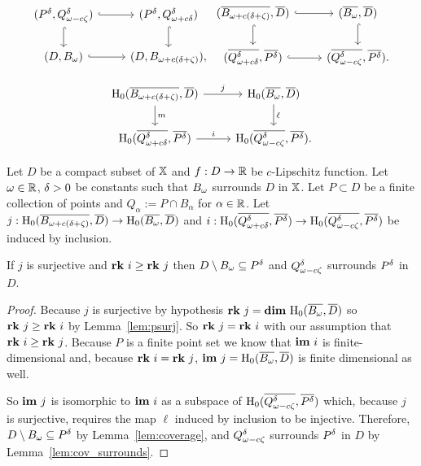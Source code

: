 \[ \begin{tikzcd}
  (P^\of, \Q^\of) \arrow[hookrightarrow]{r}\arrow[hookrightarrow]{d} &
  (P^\of, \QQ^\of) \arrow[hookrightarrow]{d} \\
  (D, \bb) \arrow[hookrightarrow]{r} &
  (D, B_{\omega+c(\delta+\zeta)}),
\end{tikzcd}\begin{tikzcd}
  (\cmp{B_{\omega+c(\delta+\zeta)}},\cmp{D})\arrow[hookrightarrow]{d}\arrow[hookrightarrow]{r} &
  (\cmp{\bb}, \cmp{D}) \arrow[hookrightarrow]{d}\\
  (\cmp{\QQ^\of}, \cmp{P^\of}) \arrow[hookrightarrow]{r} &
  (\cmp{\Q^\of}, \cmp{P^\of}).
\end{tikzcd}\]

\begin{equation}\label{dgm:1}\begin{tikzcd}
  \hom_0(\cmp{B_{\omega+c(\delta+\zeta)}},\cmp{D})\arrow{d}{m} \arrow{r}{j} &
  \hom_0(\cmp{\bb}, \cmp{D}) \arrow{d}{\ell} \\
  \hom_0(\cmp{\QQ^\of}, \cmp{P^\of}) \arrow{r}{i} &
  \hom_0(\cmp{\Q^\of}, \cmp{P^\of}).
\end{tikzcd}\end{equation}

\begin{theorem}\label{thm:geo_tcc}
  Let $D$ be a compact subset of $\mathbb{X}$ and $f : D\to\mathbb{R}$ be $c$-Lipschitz function.
  Let $\omega\in\mathbb{R}$, ${\delta} > 0$ be constants such that $B_{\omega}$ surrounds $D$ in $\mathbb{X}$.
  Let $P\subset D$ be a finite collection of points and $Q_\alpha := P\cap B_\alpha$ for $\alpha\in\mathbb{R}$.
  Let $j : \mathrm{H}_0(\overline{B_{\omega+c(\delta+\zeta)}},\overline{D})\to \mathrm{H}_0(\overline{B_{\omega}},\overline{D})$ and $i : \mathrm{H}_0(\overline{Q_{\omega + c{\delta}}^{\delta}}, \overline{P^{\delta}})\to \mathrm{H}_0(\overline{Q_{\omega - c\zeta}^{\delta}}, \overline{P^{\delta}})$ be induced by inclusion.

  If $j$ is surjective and $\mathbf{rk}~i\geq \mathbf{rk}~j$ then $D\setminus B_{\omega}\subseteq P^{\delta}$ and $Q_{\omega - c\zeta}^{\delta}$ surrounds $P^{\delta}$ in $D$.
\end{theorem}
\begin{proof}
  Because $j$ is surjective by hypothesis $\mathbf{rk}~j = \mathbf{dim}~\mathrm{H}_0(\overline{B_{\omega}},\overline{D})$ so $\mathbf{rk}~j\geq \mathbf{rk}~i$ by Lemma~\ref{lem:psurj}.
  So $\mathbf{rk}~j = \mathbf{rk}~i$ with our assumption that $\mathbf{rk}~i\geq \mathbf{rk}~j$.
  Because $P$ is a finite point set we know that $\mathbf{im}~i$ is finite-dimensional and, because $\mathbf{rk}~i = \mathbf{rk}~j$, $\mathbf{im}~j=\mathrm{H}_0(\overline{B_{\omega}}, \overline{D})$ is finite dimensional as well.

  So $\mathbf{im}~j$ is isomorphic to $\mathbf{im}~i$ as a subspace of $\mathrm{H}_0(\overline{Q_{\omega - c\zeta}^{\delta}}, \overline{P^{\delta}})$ which, because $j$ is surjective, requires the map $\ell$ induced by inclusion to be injective.
  Therefore, $D\setminus B_\omega\subseteq P^{\delta}$ by Lemma~\ref{lem:coverage}, and $Q_{\omega - c\zeta}^{\delta}$ surrounds $P^{\delta}$ in $D$ by Lemma~\ref{lem:cov_surrounds}.
\end{proof}
